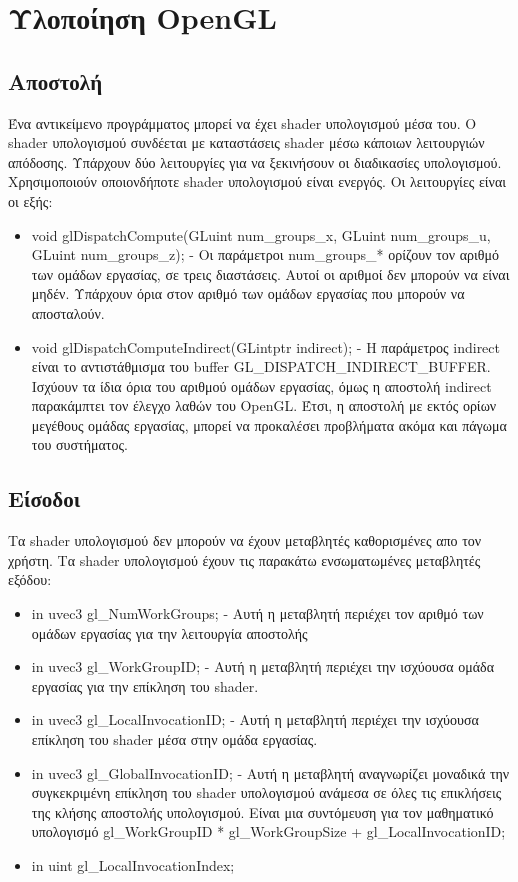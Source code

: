 \section{Υλοποίηση OpenGL}
\subsection{Αποστολή}
Ένα αντικείμενο προγράμματος μπορεί να έχει shader υπολογισμού μέσα του. Ο shader υπολογισμού συνδέεται με καταστάσεις shader μέσω κάποιων λειτουργιών απόδοσης. Υπάρχουν δύο λειτουργίες για να ξεκινήσουν οι διαδικασίες υπολογισμού. Χρησιμοποιούν οποιονδήποτε shader υπολογισμού είναι ενεργός. Οι λειτουργίες είναι οι εξής:
\begin{itemize}
\item void glDispatchCompute(GLuint num\_groups\_x, GLuint num\_groups\_u, GLuint num\_groups\_z); - Οι παράμετροι num\_groups\_* ορίζουν τον αριθμό των ομάδων εργασίας, σε τρεις διαστάσεις. Αυτοί οι αριθμοί δεν μπορούν να είναι μηδέν. Υπάρχουν όρια στον αριθμό των ομάδων εργασίας που μπορούν να αποσταλούν.
\item void glDispatchComputeIndirect(GLintptr indirect); - H παράμετρος indirect είναι το αντιστάθμισμα του buffer GL\_DISPATCH\_INDIRECT\_BUFFER. Ισχύουν τα ίδια όρια του αριθμού ομάδων εργασίας, όμως η αποστολή indirect παρακάμπτει τον έλεγχο λαθών του OpenGL. Έτσι, η αποστολή με εκτός ορίων μεγέθους ομάδας εργασίας, μπορεί να προκαλέσει προβλήματα ακόμα και πάγωμα του συστήματος.
\end{itemize}
\subsection{Είσοδοι}
Τα shader υπολογισμού  δεν μπορούν να έχουν μεταβλητές καθορισμένες απο τον χρήστη. Τα shader υπολογισμού έχουν τις παρακάτω ενσωματωμένες μεταβλητές εξόδου:
\begin{itemize}
\item in uvec3 gl\_NumWorkGroups; - Αυτή η μεταβλητή περιέχει τον αριθμό των ομάδων εργασίας για την λειτουργία αποστολής
\item in uvec3 gl\_WorkGroupID; - Αυτή η μεταβλητή περιέχει την ισχύουσα ομάδα εργασίας για την επίκληση του shader.
\item in uvec3 gl\_LocalInvocationID; - Αυτή η μεταβλητή περιέχει την ισχύουσα επίκληση του shader μέσα στην ομάδα εργασίας.
\item in uvec3 gl\_GlobalInvocationID; - Αυτή η μεταβλητή αναγνωρίζει μοναδικά την συγκεκριμένη επίκληση του shader υπολογισμού  ανάμεσα σε όλες τις επικλήσεις της κλήσης αποστολής υπολογισμού. Είναι μια συντόμευση για τον μαθηματικό υπολογισμό gl\_WorkGroupID * gl\_WorkGroupSize + gl\_LocalInvocationID;
\item in uint  gl\_LocalInvocationIndex;
\end{itemize}
